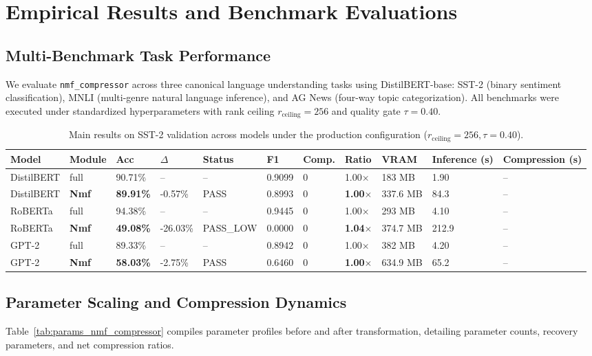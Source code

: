 \section{Empirical Results and Benchmark Evaluations}
\label{sec:results}

\subsection{Multi-Benchmark Task Performance}
We evaluate \texttt{nmf\_compressor} across three canonical language understanding tasks using DistilBERT-base: SST-2 (binary sentiment classification), MNLI (multi-genre natural language inference), and AG News (four-way topic categorization). All benchmarks were executed under standardized hyperparameters with rank ceiling $r_{\mathrm{ceiling}} = 256$ and quality gate $\tau = 0.40$.

\begin{table}[t]
\centering
\small
\begin{tabular}{lllllllllll}
\toprule
\textbf{Model} & \textbf{Module} & \textbf{Acc} & \textbf{$\Delta$} & \textbf{Status} & \textbf{F1} & \textbf{Comp.} & \textbf{Ratio} & \textbf{VRAM} & \textbf{Inference (s)} & \textbf{Compression (s)} \\
\midrule
DistilBERT & full & 90.71\% & -- & -- & 0.9099 & 0 & 1.00$\times$ & 183 MB & 1.90 & -- \\
DistilBERT & \textbf{Nmf} & \textbf{89.91\%} & -0.57\% & PASS & 0.8993 & 0 & \textbf{1.00$\times$} & 337.6 MB & 84.3 & -- \\
RoBERTa & full & 94.38\% & -- & -- & 0.9445 & 0 & 1.00$\times$ & 293 MB & 4.10 & -- \\
RoBERTa & \textbf{Nmf} & \textbf{49.08\%} & -26.03\% & PASS_LOW & 0.0000 & 0 & \textbf{1.04$\times$} & 374.7 MB & 212.9 & -- \\
GPT-2 & full & 89.33\% & -- & -- & 0.8942 & 0 & 1.00$\times$ & 382 MB & 4.20 & -- \\
GPT-2 & \textbf{Nmf} & \textbf{58.03\%} & -2.75\% & PASS & 0.6460 & 0 & \textbf{1.00$\times$} & 634.9 MB & 65.2 & -- \\
\bottomrule
\end{tabular}
\caption{Main results on SST-2 validation across models under the production configuration ($r_{\mathrm{ceiling}}=256, \tau=0.40$).}
\label{tab:main_sst2}
\end{table}

\subsection{Parameter Scaling and Compression Dynamics}
Table~\ref{tab:params_nmf_compressor} compiles parameter profiles before and after transformation, detailing parameter counts, recovery parameters, and net compression ratios.

